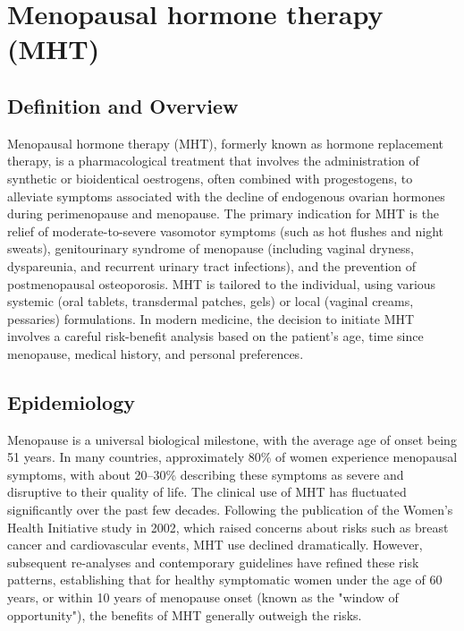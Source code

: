 \chapter{Menopausal hormone therapy (MHT)}

\section*{Definition and Overview}
Menopausal hormone therapy (MHT), formerly known as hormone replacement therapy, is a pharmacological treatment that involves the administration of synthetic or bioidentical oestrogens, often combined with progestogens, to alleviate symptoms associated with the decline of endogenous ovarian hormones during perimenopause and menopause. The primary indication for MHT is the relief of moderate-to-severe vasomotor symptoms (such as hot flushes and night sweats), genitourinary syndrome of menopause (including vaginal dryness, dyspareunia, and recurrent urinary tract infections), and the prevention of postmenopausal osteoporosis. MHT is tailored to the individual, using various systemic (oral tablets, transdermal patches, gels) or local (vaginal creams, pessaries) formulations. In modern medicine, the decision to initiate MHT involves a careful risk-benefit analysis based on the patient's age, time since menopause, medical history, and personal preferences.

\section*{Epidemiology}
Menopause is a universal biological milestone, with the average age of onset being 51 years. In many countries, approximately 80\% of women experience menopausal symptoms, with about 20--30\% describing these symptoms as severe and disruptive to their quality of life. The clinical use of MHT has fluctuated significantly over the past few decades. Following the publication of the Women's Health Initiative study in 2002, which raised concerns about risks such as breast cancer and cardiovascular events, MHT use declined dramatically. However, subsequent re-analyses and contemporary guidelines have refined these risk patterns, establishing that for healthy symptomatic women under the age of 60 years, or within 10 years of menopause onset (known as the "window of opportunity"), the benefits of MHT generally outweigh the risks.

